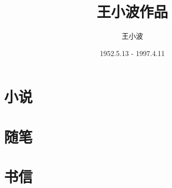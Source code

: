 \documentclass[oneside,a4paper,12pt]{book}
\begin{document}
\frontmatter
\begin{CJK*}{UTF8}{gbsn}
  \CJKindent
  \title{王小波作品}
  \author{王小波}
  \date{1952.5.13 - 1997.4.11}
  \maketitle
  \newcommand\CJKprechaptername{第}
  \newcommand\CJKchaptername{号作品}
  \renewcommand{\chaptermark}[1]{\markboth{\CJKprechaptername~\thechapter~\CJKchaptername\  #1}{}}
  \renewcommand\chaptername{\CJKprechaptername~\thechapter~\CJKchaptername}
  \renewcommand{\contentsname}{目\hspace{1em}录} 

  
  \tableofcontents
  \setcounter{secnumdepth}{1}
  \part{小说}
  \mainmatter
  
  
  
  
  
  
  
  
  
  
  
  
  
  
  
  
  
  
  
  
  
  
  
  
  
  
  
  \part{随笔}
  
  \part{书信}
  
  \backmatter
\end{CJK*}
\end{document}

